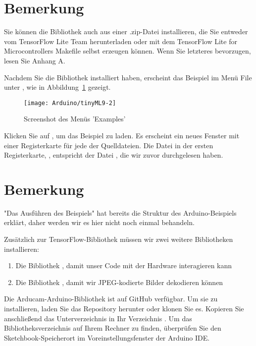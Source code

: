 \section{Bemerkung}

Sie können die Bibliothek auch aus einer .zip-Datei installieren, die Sie entweder vom TensorFlow Lite Team herunterladen oder mit dem TensorFlow Lite for Microcontrollers Makefile selbst erzeugen können. Wenn Sie letzteres bevorzugen, lesen Sie Anhang A.

Nachdem Sie die Bibliothek installiert haben, erscheint das Beispiel  im Menü File unter , wie in Abbildung~\ref{tinyML9-2} gezeigt.

\begin{figure}
  \texttt{[image: Arduino/tinyML9-2]}
  \caption{Screenshot des Menüs 'Examples'}\label{tinyML9-2}
\end{figure}



Klicken Sie auf , um das Beispiel zu laden. Es erscheint ein neues Fenster mit einer Registerkarte für jede der Quelldateien. Die Datei in der ersten Registerkarte, , entspricht der Datei , die wir zuvor durchgelesen haben.

\section{Bemerkung}

"Das Ausführen des Beispiels" hat bereits die Struktur des Arduino-Beispiels erklärt, daher werden wir es hier nicht noch einmal behandeln.

Zusätzlich zur TensorFlow-Bibliothek müssen wir zwei weitere Bibliotheken installieren:

\begin{enumerate}
  \item Die Bibliothek , damit unser Code mit der Hardware interagieren kann
  \item Die Bibliothek , damit wir JPEG-kodierte Bilder dekodieren können
\end{enumerate}

Die Arducam-Arduino-Bibliothek ist auf GitHub verfügbar. Um sie zu installieren, laden Sie das Repository herunter oder klonen Sie es. Kopieren Sie anschließend das Unterverzeichnis  in Ihr Verzeichnis . Um das Bibliotheksverzeichnis auf Ihrem Rechner zu finden, überprüfen Sie den Sketchbook-Speicherort im Voreinstellungsfenster der Arduino IDE.


